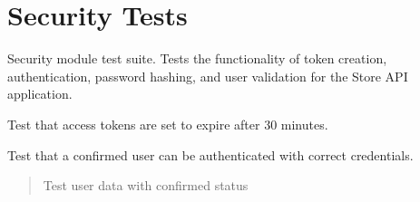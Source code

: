 \documentclass[letterpaper,10pt,openany,oneside,english]{sphinxmanual}
\begin{document}
\section{Security Tests}
\label{\detokenize{modules/tests:module-storeapi.tests.test_security}}\label{\detokenize{modules/tests:security-tests}}
\sphinxAtStartPar
Security module test suite.
Tests the functionality of token creation, authentication, password hashing,
and user validation for the Store API application.

\begin{savenotes}\begin{fulllineitems}
\label{\detokenize{modules/tests:storeapi.tests.test_security.test_access_token_expire_minutes}}
\pysigstartsignatures
{}
\pysigstopsignatures
\sphinxAtStartPar
Test that access tokens are set to expire after 30 minutes.

\end{fulllineitems}\end{savenotes}


\begin{savenotes}\begin{fulllineitems}
\label{\detokenize{modules/tests:storeapi.tests.test_security.test_authenticate_user}}
\pysigstartsignatures
{}
\pysigstopsignatures
\sphinxAtStartPar
Test that a confirmed user can be authenticated with correct credentials.
\begin{quote}\begin{description}
\sphinxAtStartPar
{} \textendash{} Test user data with confirmed status

\end{description}\end{quote}

\end{fulllineitems}\end{savenotes}
\end{document}
